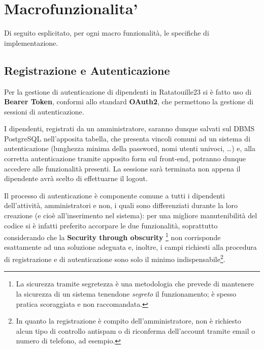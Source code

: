 	\section{Macrofunzionalita'}
	Di seguito esplicitato, per ogni macro funzionalità, le specifiche di implementazione.


	\subsection{Registrazione e Autenticazione}
	Per la gestione di autenticazione di dipendenti in Ratatouille23 si è fatto uso di \textbf{Bearer Token}, conformi allo standard \textbf{OAuth2}\footnotemark,
	che permettono la gestione di sessioni di autenticazione.


	I dipendenti, registrati da un amministratore, saranno dunque salvati sul DBMS PostgreSQL nell'apposita tabella, che presenta vincoli comuni ad un sistema
	di autenticazione (lunghezza minima della password, nomi utenti univoci, \dots) e, alla corretta autenticazione tramite apposito form sul front-end, potranno
	dunque accedere alle funzionalità presenti. La sessione sarà terminata non appena il dipendente avrà scelto di effettuarne il logout\footnotemark.


	Il processo di autenticazione è componente comune a tutti i dipendenti dell'attività, amministratori e non, i quali sono differenziati durante la loro creazione (e cioè all'inserimento
	nel sistema): per una migliore manutenibilità del codice si è infatti preferito accorpare le due funzionalità, soprattutto considerando che la \textbf{Security through obscurity}%
	\footnote{La sicurezza tramite segretezza è una metodologia che prevede di mantenere la sicurezza di un sistema tenendone \textit{segreto} il funzionamento; è spesso pratica scoraggiata e non raccomandata.}
	non corrisponde esattamente ad una soluzione adeguata e, inoltre, i campi richiesti alla procedura di registrazione e di autenticazione sono solo il minimo indispensabile\footnote{In quanto
	la registrazione è compito dell'amministratore, non è richiesto alcun tipo di controllo antispam o di riconferma dell'account tramite email o numero di telefono, ad esempio.}.
	
